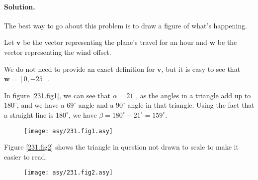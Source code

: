

\paragraph{Solution.}


The best way to go about this problem is to draw a figure of what's happening.

Let $\mathbf{v}$ be the vector representing the plane's travel for an hour and $\mathbf{w}$ be the vector representing the wind offset.

We do not need to provide an exact definition for $\mathbf{v}$, but it is easy to see that $\mathbf{w}=\left[0,-25\right]$.

In figure \vref{231.fig1}, we can see that $\alpha=21^\circ$, as the angles in a triangle add up to $180^\circ$, and we have a $69^\circ$ angle and a $90^\circ$ angle in that triangle. Using the fact that a straight line is $180^\circ$, we have $\beta=180^\circ-21^\circ=159^\circ$.

\begin{figure}[h]\caption{}\label{231.fig1}\begin{center}\texttt{[image: asy/231.fig1.asy]}\end{center}\end{figure}

Figure \vref{231.fig2} shows the triangle in question not drawn to scale to make it easier to read.

\begin{figure}[h]\caption{}\label{231.fig2}\begin{center}\texttt{[image: asy/231.fig2.asy]}\end{center}\end{figure}

